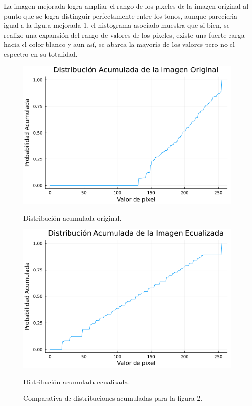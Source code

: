 \documentclass[11pt, letterpaper]{article}
\begin{document}
La imagen mejorada logra ampliar el rango de los pixeles de la imagen original al punto que se logra distinguir perfectamente entre los tonos, aunque parecieria igual a la figura mejorada 1, el histograma asociado muestra que si bien, se realizo una expansión del rango de valores de los pixeles, existe una fuerte carga hacia el color blanco y aun así, se abarca la mayoría de los valores pero no el espectro en su totalidad.

\begin{figure}[htbp]
	\centering
	\begin{minipage}{0.45\textwidth}
		\centering
		\includegraphics[width=\textwidth]{RESULTADOS/img22.png}
		\caption{Distribución acumulada original.}
		\label{fig:f15}
	\end{minipage}\hfill
	\begin{minipage}{0.45\textwidth}
		\centering
		\includegraphics[width=\textwidth]{RESULTADOS/img24.png}
		\caption{Distribución acumulada ecualizada.}
		\label{fig:f16}
	\end{minipage}
	
	\caption{Comparativa de distribuciones acumuladas para la figura 2.}
	\label{fig:R4}
\end{figure}
\end{document}

